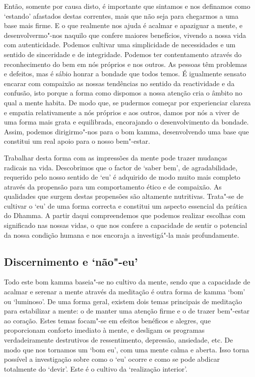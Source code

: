 Então, somente por causa disto, é importante que sintamos e nos definamos como
`estando' afastados destas correntes, mais que não seja para chegarmos a uma
base mais firme. E o que realmente nos ajuda é acalmar e apaziguar a mente, e
desenvolvermo"-nos naquilo que confere maiores benefícios, vivendo a nossa vida
com autenticidade. Podemos cultivar uma simplicidade de necessidades e um
sentido de sinceridade e de integridade. Podemos ter contentamento através do
reconhecimento do bem em nós próprios e nos outros. As pessoas têm problemas e
defeitos, mas é sábio honrar a bondade que todos temos. É igualmente sensato
encarar com compaixão as nossas tendências no sentido da reactividade e da
confusão, isto porque a forma como dispomos a nossa atenção cria o âmbito no
qual a mente habita. De modo que, se pudermos começar por experienciar clareza e
empatia relativamente a nós próprios e aos outros, damos por nós a viver de uma
forma mais grata e equilibrada, encorajando o desenvolvimento da bondade. Assim,
podemos dirigirmo"-nos para o bom kamma, desenvolvendo uma base que constitui um
real apoio para o nosso bem"-estar.

Trabalhar desta forma com as impressões da mente pode trazer mudanças radicais
na vida. Descobrimos que o factor de `saber bem', de agradabilidade, requerido
pelo nosso sentido de `eu' é adquirido de modo muito mais completo através da
propensão para um comportamento ético e de compaixão. As qualidades que surgem
destas propensões são altamente nutritivas. Trata"-se de cultivar o `eu' de uma
forma correcta e constitui um aspecto essencial da prática do Dhamma. A partir
daqui compreendemos que podemos realizar escolhas com significado nas nossas
vidas, o que nos confere a capacidade de sentir o potencial da nossa condição
humana e nos encoraja a investigá"-la mais profundamente.

\subsection{Discernimento e `não"-eu\kern -0.5pt'}

Todo este bom kamma baseia"-se no cultivo da mente, sendo que a capacidade de
acalmar e serenar a mente através da meditação é outra forma de kamma `bom' ou
`luminoso'. De uma forma geral, existem dois temas principais de meditação para
estabilizar a mente: o de manter uma atenção firme e o de trazer bem"-estar ao
coração. Estes temas focam"-se em efeitos benéficos e alegres, que proporcionam
conforto imediato à mente, e desligam os programas verdadeiramente destrutivos
de ressentimento, depressão, ansiedade, etc. De modo que nos tornamos um `bom
eu', com uma mente calma e aberta. Isso torna possível a investigação sobre como
o `eu' ocorre e como se pode abdicar totalmente do `devir'. Este é o cultivo da
`realização interior'.

